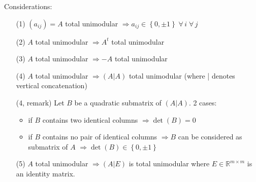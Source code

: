\documentclass[a4paper]{article}
\theoremstyle{definition}
\newcommand{\set}[1]{\left\{#1\right\}}
\newcommand{\fall}{\;\forall\,}
\begin{document}
Considerations:
\begin{enumerate}
  \item[(1)] $(a_{ij}) = A$ total unimodular $\Rightarrow a_{ij} \in \set{0,\pm 1} \fall i \fall j$
  \item[(2)] $A$ total unimodular $\Rightarrow A^t$ total unimodular
  \item[(3)] $A$ total unimodular $\Rightarrow -A$ total unimodular
  \item[(4)] $A$ total unimodular $\Rightarrow (A | A)$ total unimodular (where | denotes vertical concatenation)
  \item[(4, remark)]
    Let $B$ be a quadratic submatrix of $(A | A)$. 2 cases:
    \begin{itemize}
      \item if $B$ contains two identical columns $\Rightarrow \det(B) = 0$
      \item if $B$ contains no pair of identical columns
        $\Rightarrow B$ can be considered as submatrix of $A$
        $\Rightarrow \det(B) \in \set{0, \pm 1}$
    \end{itemize}

  \item[(5)]
    $A$ total unimodular $\Rightarrow (A | E)$ is total unimodular where $E \in \mathbb{R}^{m\times m}$ is an identity matrix.


\end{enumerate}
\end{document}
